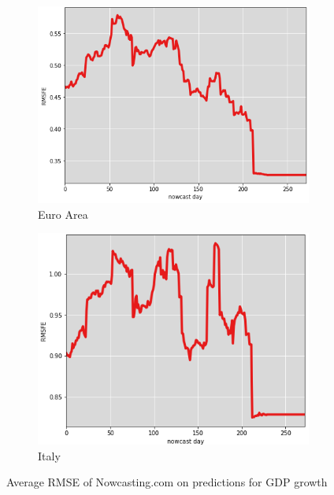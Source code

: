 \begin{figure} [H]

\centering

\begin{subfigure}[t]{0.43\textwidth}

	\centering

	\includegraphics[width=\linewidth]{images/rmse_gdp_ea.png}

	\caption{Euro Area}
\end{subfigure} 	\hspace{1cm}
\begin{subfigure}[t]{0.4\textwidth}

	\centering

	\includegraphics[width=\linewidth]{images/rmse_gdp_it.png}

	\caption{Italy}
\end{subfigure}

\caption{Average RMSE of Nowcasting.com on predictions for GDP growth}

\label{fig_c2_s1_1}
\vspace{-3mm}
\end{figure}

